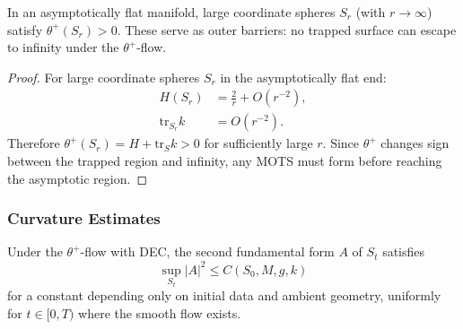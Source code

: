 \begin{lemma}
\label{lem:asymptotic-barrier}
In an asymptotically flat manifold, large coordinate spheres $S_r$ (with $r \to \infty$) satisfy $\theta^+(S_r) > 0$. These serve as outer barriers: no trapped surface can escape to infinity under the $\theta^+$-flow.
\end{lemma}

\begin{proof}
For large coordinate spheres $S_r$ in the asymptotically flat end:
\begin{align}
H(S_r) &= \frac{2}{r} + O(r^{-2}), \\
\mathrm{tr}_{S_r} k &= O(r^{-2}).
\end{align}
Therefore $\theta^+(S_r) = H + \mathrm{tr}_S k > 0$ for sufficiently large $r$. Since $\theta^+$ changes sign between the trapped region and infinity, any MOTS must form before reaching the asymptotic region.
\end{proof}

\subsubsection{Curvature Estimates}

\begin{proposition}
\label{prop:curvature-bounds}
Under the $\theta^+$-flow with DEC, the second fundamental form $A$ of $S_t$ satisfies
\begin{equation}
\sup_{S_t} |A|^2 \leq C(S_0, M, g, k)
\end{equation}
for a constant depending only on initial data and ambient geometry, uniformly for $t \in [0, T)$ where the smooth flow exists.
\end{proposition}


